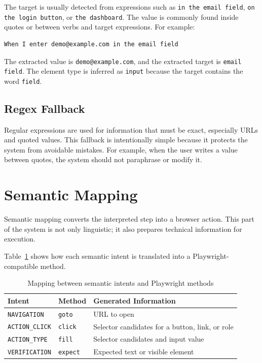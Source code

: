 The target is usually detected from expressions such as \texttt{in the email field}, \texttt{on the login button}, or \texttt{the dashboard}. The value is commonly found inside quotes or between verbs and target expressions. For example:

\begin{verbatim}
When I enter demo@example.com in the email field
\end{verbatim}

The extracted value is \texttt{demo@example.com}, and the extracted target is \texttt{email field}. The element type is inferred as \texttt{input} because the target contains the word \texttt{field}.

\subsection{Regex Fallback}
\label{subsec:regex_extraction}

Regular expressions are used for information that must be exact, especially URLs and quoted values. This fallback is intentionally simple because it protects the system from avoidable mistakes. For example, when the user writes a value between quotes, the system should not paraphrase or modify it.

\section{Semantic Mapping}
\label{sec:semantic_mapping}

Semantic mapping converts the interpreted step into a browser action. This part of the system is not only linguistic; it also prepares technical information for execution.

Table~\ref{tab:intent_action_mapping} shows how each semantic intent is translated into a Playwright-compatible method.

\begin{table}[H]
	\centering
	\caption{Mapping between semantic intents and Playwright methods}
	\label{tab:intent_action_mapping}
	\renewcommand{\arraystretch}{1.3}
	\small
	\begin{tabularx}{\textwidth}{|l|l|X|}
		\hline
		\rowcolor{gray!20}
		\textbf{Intent} & \textbf{Method} & \textbf{Generated Information} \\ \hline
		\texttt{NAVIGATION} & \texttt{goto} & URL to open \\ \hline
		\texttt{ACTION\_CLICK} & \texttt{click} & Selector candidates for a button, link, or role \\ \hline
		\texttt{ACTION\_TYPE} & \texttt{fill} & Selector candidates and input value \\ \hline
		\texttt{VERIFICATION} & \texttt{expect} & Expected text or visible element \\ \hline
	\end{tabularx}
\end{table}

